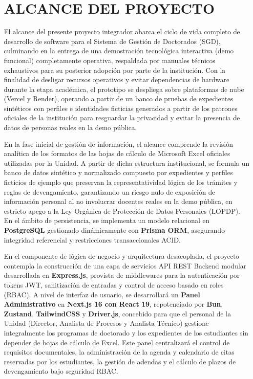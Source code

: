 
\section{ALCANCE DEL PROYECTO}

El alcance del presente proyecto integrador abarca el ciclo de vida completo de desarrollo de software para el Sistema de Gestión de Doctorados (SGD), culminando en la entrega de una demostración tecnológica interactiva (demo funcional) completamente operativa, respaldada por manuales técnicos exhaustivos para su posterior adopción por parte de la institución. Con la finalidad de desligar recursos operativos y evitar dependencias de hardware durante la etapa académica, el prototipo se despliega sobre plataformas de nube (Vercel y Render), operando a partir de un banco de pruebas de expedientes sintéticos con perfiles e identidades ficticias generados a partir de los patrones oficiales de la institución para resguardar la privacidad y evitar la presencia de datos de personas reales en la demo pública.

En la fase inicial de gestión de información, el alcance comprende la revisión analítica de los formatos de las hojas de cálculo de Microsoft Excel oficiales utilizadas por la Unidad. A partir de dicha estructura institucional, se formula un banco de datos sintético y normalizado compuesto por expedientes y perfiles ficticios de ejemplo que preservan la representatividad lógica de los trámites y reglas de devengamiento, garantizando un riesgo nulo de exposición de información personal al no involucrar docentes reales en la demo pública, en estricto apego a la Ley Orgánica de Protección de Datos Personales (LOPDP). En el ámbito de persistencia, se implementa un modelo relacional en \textbf{PostgreSQL} gestionado dinámicamente con \textbf{Prisma ORM}, asegurando integridad referencial y restricciones transaccionales ACID.

En el componente de lógica de negocio y arquitectura desacoplada, el proyecto contempla la construcción de una capa de servicios API REST Backend modular desarrollada en \textbf{Express.js}, provista de middlewares para la autenticación por tokens JWT, sanitización de entradas y control de acceso basado en roles (RBAC). A nivel de interfaz de usuario, se desarrollará un \textbf{Panel Administrativo} en \textbf{Next.js 16 con React 19}, repotenciado por \textbf{Bun}, \textbf{Zustand}, \textbf{TailwindCSS} y \textbf{Driver.js}, concebido para que el personal de la Unidad (Director, Analista de Procesos y Analista Técnico) gestione integralmente los programas de doctorado y los expedientes de los estudiantes sin depender de hojas de cálculo de Excel. Este panel centralizará el control de requisitos documentales, la administración de la agenda y calendario de citas reservadas por los estudiantes, la gestión de adendas y el cálculo de plazos de devengamiento bajo seguridad RBAC.

